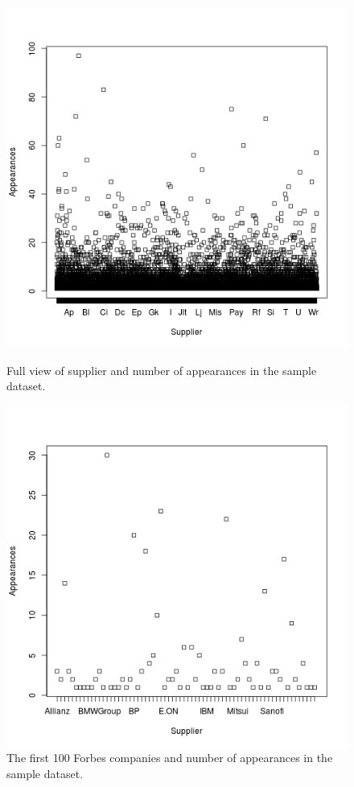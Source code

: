 \documentclass{llncs}
\begin{document}
\begin{figure}[ht]
\begin{minipage}[b]{0.45\linewidth}
\centering
	\includegraphics[width=\textwidth]{./imgs/corfu-stats}
 \caption{Full view of supplier and number of appearances in the sample dataset.}
 \label{fig:results-graph-3}
\end{minipage}
\hspace{0.5cm}
\begin{minipage}[b]{0.45\linewidth}
\centering
	\includegraphics[width=\textwidth]{./imgs/corfu-forbes-100}
\caption{The first 100 Forbes companies and number of appearances in the sample dataset. }
 \label{fig:results-graph-4}
\end{minipage}
\end{figure}
\end{document}
